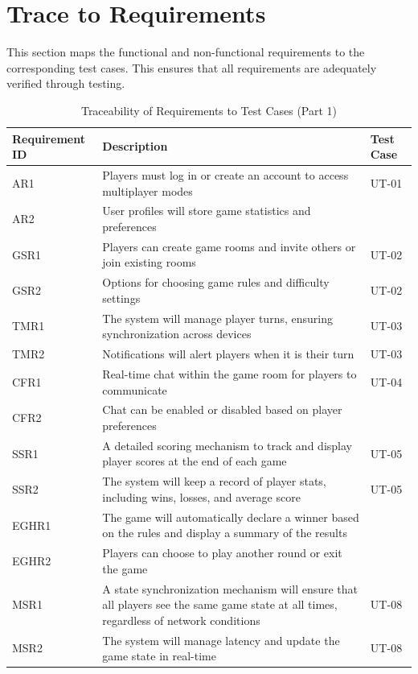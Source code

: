 \documentclass[12pt, titlepage]{article}
\begin{document}
\section{Trace to Requirements}

This section maps the functional and non-functional requirements to the corresponding test cases. This ensures that all requirements are adequately verified through testing.

\begin{table}[H]
    \centering
    \begin{tabularx}{\textwidth}{|l|X|l|}
        \hline
        \textbf{Requirement ID} & \textbf{Description} & \textbf{Test Case} \\
        \hline
        AR1 & Players must log in or create an account to access multiplayer modes & UT-01 \\
        AR2 & User profiles will store game statistics and preferences &  \\
        GSR1 & Players can create game rooms and invite others or join existing rooms & UT-02 \\
        GSR2 & Options for choosing game rules and difficulty settings & UT-02 \\
        TMR1 & The system will manage player turns, ensuring synchronization across devices & UT-03 \\
        TMR2 & Notifications will alert players when it is their turn & UT-03 \\
        CFR1 & Real-time chat within the game room for players to communicate & UT-04 \\
        CFR2 & Chat can be enabled or disabled based on player preferences &  \\
        SSR1 & A detailed scoring mechanism to track and display player scores at the end of each game & UT-05 \\
        SSR2 & The system will keep a record of player stats, including wins, losses, and average score & UT-05 \\
        EGHR1 & The game will automatically declare a winner based on the rules and display a summary of the results &  \\
        EGHR2 & Players can choose to play another round or exit the game &  \\
        MSR1 & A state synchronization mechanism will ensure that all players see the same game state at all times, regardless of network conditions & UT-08 \\
        MSR2 & The system will manage latency and update the game state in real-time & UT-08 \\
        \hline
    \end{tabularx}
    \caption{Traceability of Requirements to Test Cases (Part 1)}
    \label{tab:trace_requirements_1}
\end{table}
\end{document}
